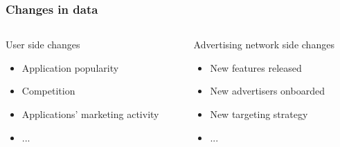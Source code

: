 \documentclass[intlimits, 9pt, unicode]{beamer}
\begin{document}
\begin{frame}
    \frametitle{Changes in data}
    
       {\begin{columns}
        \begin{column}{5cm}
        User side changes
         \begin{itemize}
    		\item Application popularity
		\item Competition
		\item Applications' marketing activity
		\item ...
   	 \end{itemize}
        \end{column}

        \begin{column}{5cm}
        Advertising network side changes
         \begin{itemize}
    		\item New features released
		\item New advertisers onboarded
		\item New targeting strategy
		\item ...
   	 \end{itemize}
	 \end{column}
    \end{columns}}

 \end{frame}
\end{document}
